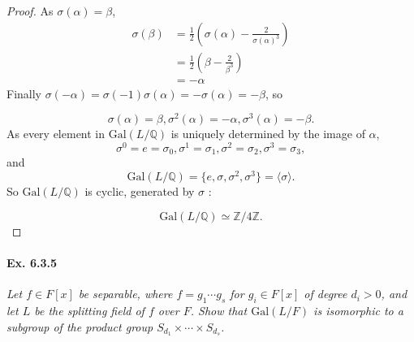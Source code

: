 \documentclass[11pt,a4paper]{article}
\newcommand{\Q}{\mathbb{Q}}
\newcommand{\Z}{\mathbb{Z}}
\newcommand{\Gal}{\mathrm{Gal}}
\begin{document}
\begin{proof}
As $\sigma(\alpha) = \beta$,
\begin{align*}
\sigma(\beta) &=  \frac{1}{2}\left(\sigma(\alpha) - \frac{2}{\sigma(\alpha)^3}\right)\\
&=\frac{1}{2}\left(\beta - \frac{2}{\beta^3}\right)\\
&=-\alpha
\end{align*}
Finally $\sigma(-\alpha) =\sigma(-1) \sigma(\alpha) = -\sigma(\alpha) = -\beta$, so

$$ \sigma(\alpha) = \beta, \sigma^2(\alpha) = -\alpha, \sigma^3(\alpha) = -\beta.$$
As every element in $\Gal(L/\Q)$ is uniquely determined by the image of $\alpha$,  $$\sigma^0 = e = \sigma_0, \sigma^1 =\sigma_1,\sigma^2 = \sigma_2,\sigma^3 = \sigma_3,$$ and
$$\Gal(L/\Q) = \{e,\sigma,\sigma^2,\sigma^3\} = \langle \sigma \rangle.$$
So $\Gal(L/\Q)$ is cyclic, generated by  $\sigma$ :

$$\Gal(L/\Q) \simeq \Z/4\Z.$$
\end{proof}

\paragraph{Ex. 6.3.5}

{\it Let $f \in F[x]$ be separable, where $f = g_1\cdots g_s$ for $g_i \in F[x]$ of degree $d_i>0$, and let $L$ be the splitting field of $f$ over $F$. Show that $\Gal(L/F)$ is isomorphic to a subgroup of the product group $S_{d_1} \times \cdots \times S_{d_s}$.
}
\end{document}
